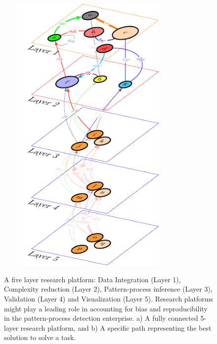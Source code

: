\documentclass[english,12pt]{article}
\begin{document}
\vspace{-7 in}
\begin{figure}
  \vspace{-7 in}
\begin{center}
  \hspace{-0.5 in}\includegraphics[width=9cm,height=14cm]{multilayer.pdf}\\
\end{center}
\caption{A five layer research platform: Data Integration (Layer 1),
  Complexity reduction (Layer 2), Pattern-process inference (Layer 3),
  Validation (Layer 4) and Visualization (Layer 5). Research platforms
  might play a leading role in accounting for bias and reproducibility
  in the pattern-process detection enterprise. a) A fully connected
  5-layer research platform, and b) A specific path representing the
  best solution to solve a task.}
\label{}
\end{figure}
  
\end{document}
